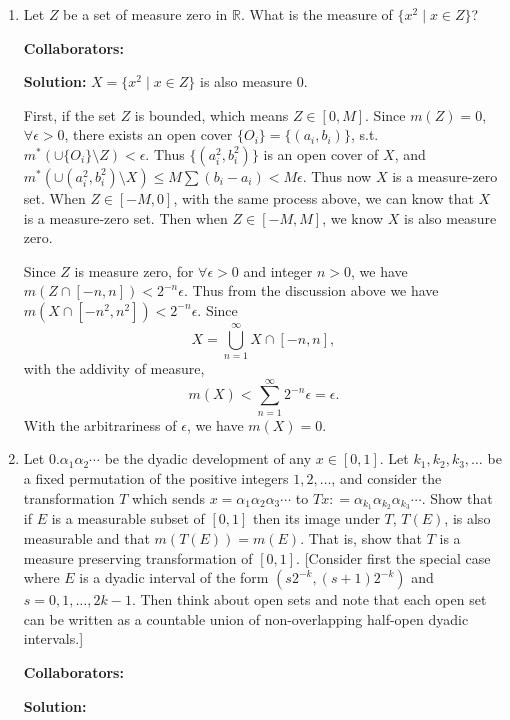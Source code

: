 \documentclass{article}%
\begin{document}
\begin{enumerate}
\bigskip





\item Let $Z$ be a set of measure zero in $\mathbb{R}$.  What is the measure of $\{x^2 \mid x\in Z\}$?



\bigskip
\textbf{Collaborators:}\\
\smallskip
 
\textbf{Solution:}
$X = \{x^2\mid x\in Z\}$ is also measure 0. 

First, if the set $Z$ is bounded, which means $Z\in [0, M]$. Since $m(Z) = 0$, $\forall \epsilon > 0$, there exists an open cover $\{O_i\} = \{(a_i, b_i)\}$, s.t. $m^*(\cup\{O_i\}\setminus Z) < \epsilon$. Thus $\{(a_i^2, b_i^2)\}$ is an open cover of $X$, and $m^*(\cup(a_i^2, b_i^2)\setminus X) \le M\sum(b_i-a_i) < M\epsilon$. Thus now $X$ is a measure-zero set. When $Z \in [-M, 0]$, with the same process above, we can know that $X$ is a measure-zero set. Then when $Z \in [-M, M]$, we know $X$ is also measure zero.

Since $Z$ is measure zero, for $\forall \epsilon > 0$ and integer $n > 0$, we have $m(Z\cap [-n, n]) < 2^{-n}\epsilon$. Thus from the discussion above we have $m(X\cap [-n^2, n^2]) < 2^{-n}\epsilon$. Since 
$$
X = \bigcup_{n=1}^{\infty}X\cap[-n, n],
$$
with the addivity of measure, 
$$
m(X) < \sum_{n=1}^{\infty}2^{-n}\epsilon = \epsilon.
$$
With the arbitrariness of $\epsilon$, we have $m(X) = 0$.
\bigskip


\item  Let $0.\alpha_1 \alpha_2 \cdots$ be the dyadic development of any $x\in[0,1]$. Let $k_1,k_2,k_3,\ldots$ be a fixed permutation of the positive integers $1,2,\ldots$, and consider the transformation $T$ which sends $x = \alpha_1\alpha_2\alpha_3\cdots$ to $Tx: = \alpha_{k_1}\alpha_{k_2}\alpha_{k_3}\cdots$. Show that if $E$ is a measurable subset of $[0,1]$ then its image under $T$, $T(E)$, is also measurable and that $m(T(E))= m(E)$.  That is, show that $T$ is a measure preserving transformation of $[0,1]$. [Consider first the special case where $E$ is a dyadic interval of the form $(s2^{-k}, (s+1)2^{-k})$ and $s = 0,1,\ldots, 2k-1$.  Then think about open sets and note that each open set can be written as a countable union of non-overlapping half-open dyadic intervals.]

\bigskip
\textbf{Collaborators:}\\
\smallskip
 
\textbf{Solution:}

\bigskip


\end{enumerate}
\end{document}
